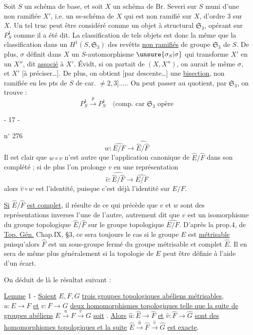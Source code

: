 Soit $S$ un schéma de base, et soit $X$ un schéma de Br. Severi sur $S$ muni d'une \uline{} non ramifiée $X'$, i.e. un ss-schéma  de $X$ qui est non ramifié sur $X$, d'ordre 3 sur $X$. Un tel truc peut être considéré comme un objet à  structural $\mathfrak S_3$, opérant sur $P^1_S$ comme il a été dit. La classification de tels objets est donc la même que la classification dans un $H^1(S,\mathfrak S_3)$ des revêtts  \uline{non ramifiés} de groupe $\mathfrak S_3$ de $S$. De plus, $\sigma$ définit dans $X$ un $S$-automorphisme   $\unsure{\sigma_S|\sigma}$ qui transforme $X'$ en un $X''$, dit \uline{associé} à $X'$. Évidt, si on partait de $(X,X'')$, on aurait le même $\sigma$, et  $X'$ [à préciser\ldots]. De plus, on obtient [par descente\ldots] une \uline{bisection}, non ramifiée \deleted{\unsure{[en ses points}} en les pts de $S$ de car. $\ne2,3$]..... On peut passer au quotient,  par $\mathfrak S_3$,  on trouve  :
\[
P^1_S\xrightarrow{p}P^1_S\quad\text{(comp. car }\mathfrak S_3\text{ opère}
\]

\begin{center}- 17 -\end{center}
\hfill n$^\circ$ 276
\[
w:\widehat{E/F}\longrightarrow\widehat{\hat E/\hat F}
\]
Il est clair que $w\circ v$ n'est autre que l'application canonique de $\hat E/\hat F$ dans son complété ; si de plus l'on prolonge $v$ en une représentation
\[
\hat v:\widehat{\hat E/\hat F}\longrightarrow\widehat{E/F}
\]
alors $\hat v\circ w$ est l'identité, puisque c'est déjà l'identité sur $E/F$.

\uline{Si} $\hat E/\hat F$ \uline{est complet}, il résulte de ce qui précède que $v$ et $w$ sont des représentations inverses l'une de l'autre, autrement dit que $v$ est un isomorphisme du groupe topologique $\hat E/\hat F$ sur le groupe topologique $\widehat{E/F}$. D'après la prop.4, de \uline{Top. Gén.} Chap.IX, \S3, ce sera toujours le cas si le groupe $E$ est \uline{métrisable} puisqu'alors $\hat F$ est un sous-groupe fermé du groupe métrisable et complet $\hat E$. Il en sera de même plus généralement si la topologie de $E$ peut être définie à l'aide d'un écart.

On déduit de là le résultat suivant :

\uline{Lemme} 1 - \uline{Soient} $E,F,G$ \uline{trois groupes topologiques abéliens métrisables}, $u:E\longrightarrow F$ \uline{et} $v:F\longrightarrow G$ \uline{deux homomorphismes topologiques telle que la suite de groupes abéliens} $E\xrightarrow{u}F\xrightarrow{v}G$ \uline{soit} . \uline{Alors} $\hat u:\hat E\to\hat F$ \uline{et} $\hat v:\hat F\longrightarrow\hat G$ \uline{sont des homomorphismes topologiques et la suite} $\hat E\xrightarrow{\hat u}\hat F\xrightarrow{\hat v}\hat G$ \uline{est exacte}.

